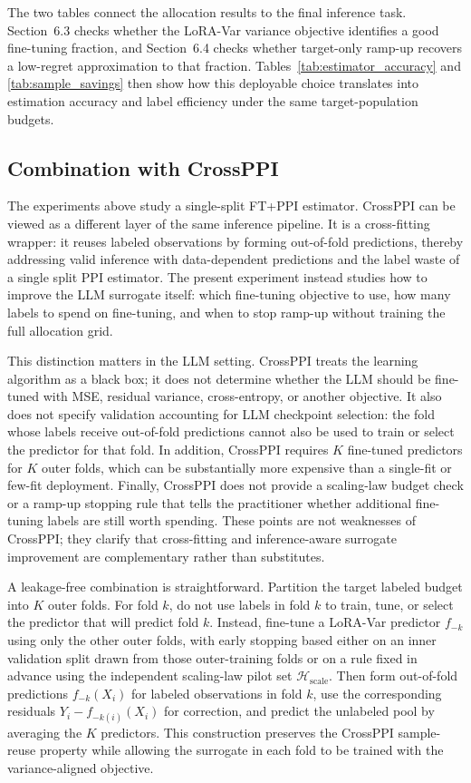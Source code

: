 \documentclass[11pt]{article}
\begin{document}
The two tables connect the allocation results to the final inference task. Section~6.3 checks
whether the LoRA-Var variance objective identifies a good fine-tuning fraction, and Section~6.4
checks whether target-only ramp-up recovers a low-regret approximation to that fraction.
Tables~\ref{tab:estimator_accuracy} and \ref{tab:sample_savings} then show how this deployable
choice translates into estimation accuracy and label efficiency under the same target-population
budgets.

\subsection{Combination with CrossPPI}
\label{subsec:crossppi_combination}

The experiments above study a single-split FT+PPI estimator. CrossPPI can be viewed as a
different layer of the same inference pipeline. It is a cross-fitting wrapper: it reuses labeled
observations by forming out-of-fold predictions, thereby addressing valid inference with
data-dependent predictions and the label waste of a single split PPI estimator. The present
experiment instead studies how to improve the LLM surrogate itself: which fine-tuning objective to
use, how many labels to spend on fine-tuning, and when to stop ramp-up without training the full
allocation grid. 

This distinction matters in the LLM setting. CrossPPI treats the learning algorithm as a black
box; it does not determine whether the LLM should be fine-tuned with MSE, residual variance,
cross-entropy, or another objective. It also does not specify validation accounting for LLM
checkpoint selection: the fold whose labels receive out-of-fold predictions cannot also be used
to train or select the predictor for that fold. In addition, CrossPPI requires $K$ fine-tuned
predictors for $K$ outer folds, which can be substantially more expensive than a single-fit or
few-fit deployment. Finally, CrossPPI does not provide a scaling-law budget check or a ramp-up
stopping rule that tells the practitioner whether additional fine-tuning labels are still worth
spending. These points are not weaknesses of CrossPPI; they clarify that cross-fitting and
inference-aware surrogate improvement are complementary rather than substitutes.

A leakage-free combination is straightforward. Partition the target labeled budget into $K$ outer
folds. For fold $k$, do not use labels in fold $k$ to train, tune, or select the predictor that
will predict fold $k$. Instead, fine-tune a LoRA-Var predictor $f_{-k}$ using only the other outer
folds, with early stopping based either on an inner validation split drawn from those outer-training
folds or on a rule fixed in advance using the independent scaling-law pilot set
$\mathcal{H}_{\mathrm{scale}}$. Then form out-of-fold predictions $f_{-k}(X_i)$ for labeled
observations in fold $k$, use the corresponding residuals $Y_i-f_{-k(i)}(X_i)$ for correction, and
predict the unlabeled pool by averaging the $K$ predictors. This construction preserves the
CrossPPI sample-reuse property while allowing the surrogate in each fold to be trained with the
variance-aligned objective.
\end{document}
